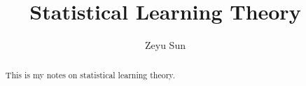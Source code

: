 \documentclass[a4paper]{report}
\author{Zeyu Sun}
\title{Statistical Learning Theory}
\begin{document}
\maketitle

\begin{abstract}
	This is my notes on statistical learning theory.
\end{abstract}

\tableofcontents


\newpage
\appendix
\appendixpage{}



\newpage
\printbibliography{}
\end{document}
